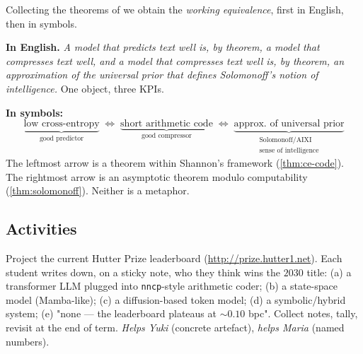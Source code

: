 \documentclass[12pt,a4paper]{article}
\theoremstyle{plain}
\theoremstyle{definition}
\begin{document}
Collecting the theorems of  we
obtain the \emph{working equivalence}, first in English, then in
symbols.

\medskip
\noindent\textbf{In English.}  \emph{A model that predicts text
well is, by theorem, a model that compresses text well, and a model
that compresses text well is, by theorem, an approximation of the
universal prior that defines Solomonoff's notion of intelligence.}
One object, three KPIs.

\medskip
\noindent\textbf{In symbols:}
\begin{equation}
  \underbrace{\text{low cross-entropy}}_{\text{good predictor}}
  \;\Longleftrightarrow\;
  \underbrace{\text{short arithmetic code}}_{\text{good compressor}}
  \;\Longleftrightarrow\;
  \underbrace{\text{approx.\ of universal prior}}_{\substack{\text{Solomonoff/AIXI}\\\text{sense of intelligence}}}
  \label{eq:chain}
\end{equation}
The leftmost arrow is a theorem within Shannon's framework
(\cref{thm:ce-code}).  The rightmost arrow is an asymptotic
theorem modulo computability (\cref{thm:solomonoff}).  Neither is
a metaphor.

\subsection*{Activities}

\begin{activity}[title={Activity 1 --- Hutter Prize bingo}]
Project the current Hutter Prize leaderboard
(\url{http://prize.hutter1.net}).  Each student writes down, on a
sticky note, who they think wins the $2030$ title: (a) a
transformer LLM plugged into \texttt{nncp}-style arithmetic coder;
(b) a state-space model (Mamba-like); (c) a diffusion-based token
model; (d) a symbolic/hybrid system; (e) "none --- the leaderboard
plateaus at $\sim 0.10$ bpc".  Collect notes, tally, revisit at the
end of term.  \emph{Helps Yuki} (concrete artefact),
\emph{helps Maria} (named numbers).
\end{activity}
\end{document}
